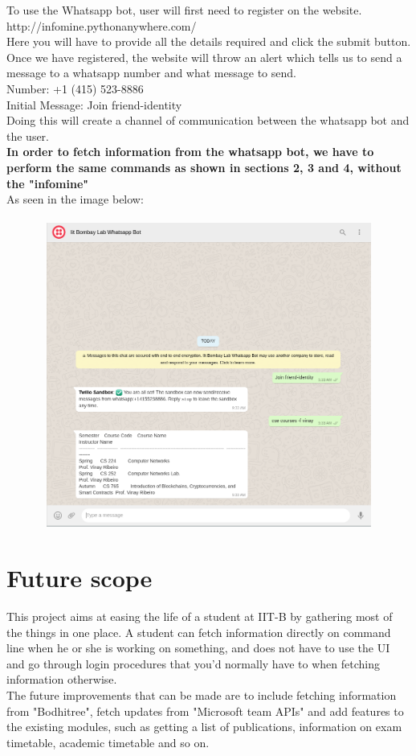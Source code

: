 \documentclass[12pt, a4paper]{article}
\begin{document}
To use the Whatsapp bot, user will first need to register on the website.\\
http://infomine.pythonanywhere.com/ \\
Here you will have to provide all the details required and click the submit button. Once we have registered, the website will throw an alert which tells us to send a message to a whatsapp number and what message to send.\\
Number: +1 (415) 523-8886 \\
Initial Message: Join friend-identity \\
Doing this will create a channel of communication between the whatsapp bot and the user. \\
\textbf{In order to fetch information from the whatsapp bot, we have to perform the same commands as shown in sections 2, 3 and 4, without the "infomine"}\\
As seen in the image below: \\
\\
\includegraphics[width=14cm, height=10cm]{whatsappbot}

\section{Future scope}
This project aims at easing the life of a student at IIT-B by gathering most of the things in one place. A student can fetch information directly on command line when he or she is working on something, and does not have to use the UI and go through login procedures that you'd normally have to when fetching information otherwise.\\
The future improvements that can be made are to include fetching information from "Bodhitree", fetch updates from "Microsoft team APIs" and add features to the existing modules, such as getting a list of publications, information on exam timetable, academic timetable and so on.
\end{document}
